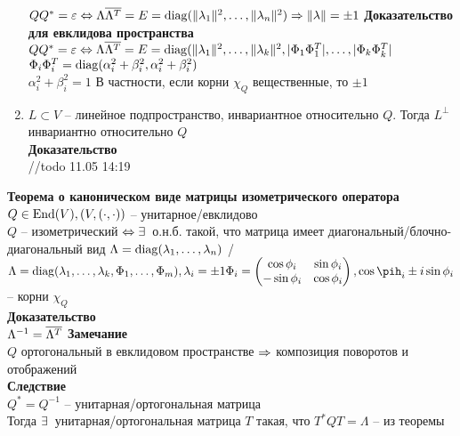 \documentclass[12pt]{article}
\begin{document}
\begin{enumerate}
    $QQ^* = \varepsilon \Leftrightarrow \Lambda \overline{ \Lambda^T} = E = \operatorname{diag}(\| \lambda_1\|^2, \ldots, \| \lambda_n\|^2) \Rightarrow \|\lambda\| = \pm 1$
    \textbf{Доказательство для евклидова пространства}
    $QQ^* = \varepsilon \Leftrightarrow \Lambda \overline{ \Lambda^T} = E = \operatorname{diag}(\| \lambda_1\|^2, \ldots, \| \lambda_k\|^2, |\Phi_1\Phi_1^T|, \ldots, |\Phi_k\Phi_k^T|$\\
    $ \Phi_i \Phi_i^T = \operatorname{diag}( \alpha_i^2 + \beta_i^2, \alpha_i^2 + \beta_i^2)$\\
    $ \alpha_i^2 + \beta_i^2 = 1$
    В частности, если корни $\chi_Q$ вещественные, то $\pm 1$\\
    \item $L \subset V$ -- линейное подпространство, инвариантное относительно $Q$. Тогда $L^\perp$ инвариантно относительно $Q$\\
    \textbf{Доказательство}\\
    //todo 11.05 14:19
\end{enumerate}
\textbf{Теорема о каноническом виде матрицы изометрического оператора}\\
$Q \in \operatorname{End}(V), (V, (\cdot, \cdot))$ -- унитарное/евклидово\\
$Q$ -- изометрический $\Leftrightarrow \exists\,$ о.н.б. такой, что матрица имеет диагональный/блочно-диагональный вид
$ \Lambda = \operatorname{diag}( \lambda_1, \ldots, \lambda_n)$ / $ \Lambda = \nm{diag}(\lambda_1, \ldots, \lambda_k, \Phi_1, \ldots, \Phi_m), \lambda_i = \pm 1 \Phi_i = \begin{pmatrix}
    \cos \phi_i & \sin \phi_i\\
    -\sin \phi_i & \cos \phi_i
\end{pmatrix}, \cos \pih_i \pm i\sin \phi_i$ -- корни $\chi_Q$\\
\textbf{Доказательство}\\
$ \Lambda^{-1} = \overline{ \Lambda^T}$
\textbf{Замечание}\\
$Q$ ортогональный в евклидовом пространстве $\Rightarrow$ композиция поворотов и отображений\\
\textbf{Следствие}\\
$Q^* = Q^{-1}$ -- унитарная/ортогональная матрица\\
Тогда $\exists\,$ унитарная/ортогональная матрица $T$ такая, что $T^* Q T = \Lambda$ -- из теоремы
\end{document}
